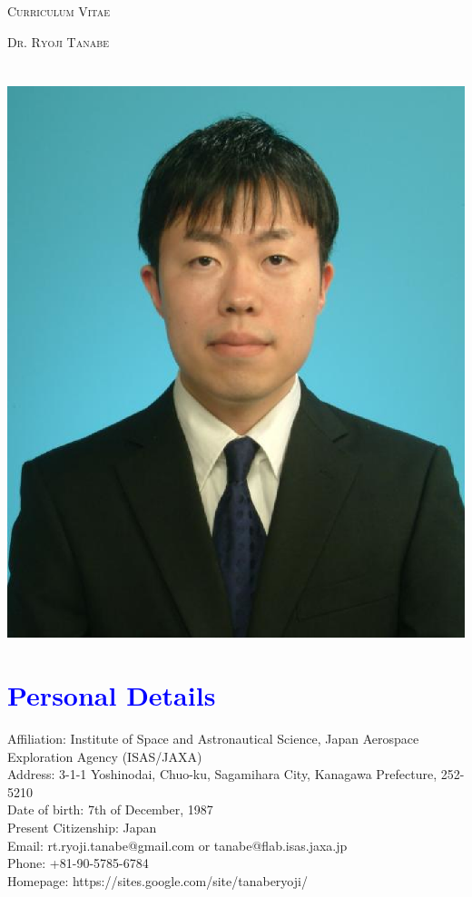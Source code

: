 \documentclass[letterpaper]{article}
\begin{document}
\pagestyle{empty}

\begin{center}
  \huge{\textsc{Curriculum Vitae}}
\vspace{\baselineskip}

\Large{\textsc{Dr. Ryoji Tanabe}}
\end{center}
\vspace{1.5\baselineskip}


\section{}

 \begin{flushright}
   \includegraphics[width=.2\linewidth]{tanabe.eps}
 \end{flushright}

\section{\textcolor{blue}{Personal Details}}

\begin{flushleft}
Affiliation: Institute of Space and Astronautical Science, Japan Aerospace Exploration Agency (ISAS/JAXA)\\
Address: 3-1-1 Yoshinodai, Chuo-ku, Sagamihara City, Kanagawa Prefecture, 252-5210\\
Date of birth: 7th of December, 1987\\
Present Citizenship: Japan\\
  Email: rt.ryoji.tanabe@gmail.com or tanabe@flab.isas.jaxa.jp\\
  Phone: +81-90-5785-6784 \\
  Homepage: https://sites.google.com/site/tanaberyoji/
\end{flushleft}
\end{document}
